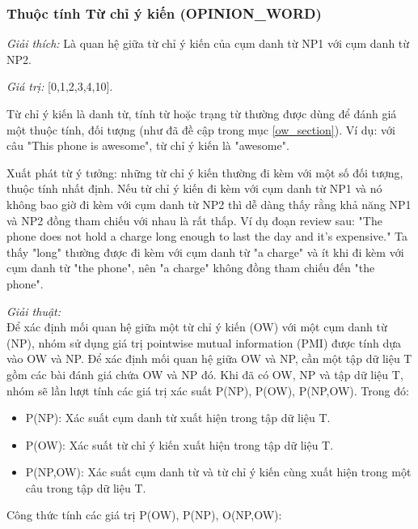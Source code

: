 \documentclass[12pt]{extarticle}
\begin{document}
			\subsubsection*{Thuộc tính Từ chỉ ý kiến (OPINION\_WORD)}
				\par \textit{Giải thích:} Là quan hệ giữa từ chỉ ý kiến của cụm danh từ NP1 với cụm danh từ NP2.
				\par \textit{Giá trị:} [0,1,2,3,4,10]. 
				\par Từ chỉ ý kiến là danh từ, tính từ hoặc trạng từ thường được dùng để đánh giá một thuộc tính, đối tượng (như đã đề cập trong mục \ref{ow_section}). Ví dụ: với câu "This phone is awesome", từ chỉ ý kiến là "awesome".
				\par Xuất phát từ ý tưởng: những từ chỉ ý kiến thường đi kèm với một số đối tượng, thuộc tính nhất định. Nếu từ chỉ ý kiến đi kèm với cụm danh từ NP1 và nó không bao giờ đi kèm với cụm danh từ NP2 thì dễ dàng thấy rằng khả năng NP1 và NP2 đồng tham chiếu với nhau là rất thấp. Ví dụ đoạn review sau: "The phone does not hold a charge long enough to last the day and it’s expensive." Ta thấy "long" thường được đi kèm với cụm danh từ "a charge" và ít khi đi kèm với cụm danh từ "the phone", nên "a charge" không đồng tham chiếu đến "the phone".
				\par \textit{Giải thuật:}
				\\Để xác định mối quan hệ giữa một từ chỉ ý kiến (OW) với một cụm danh từ (NP), nhóm sử dụng giá trị pointwise mutual information (PMI) được tính dựa vào OW và NP. Để xác định mối quan hệ giữa OW và NP, cần một tập dữ liệu T gồm các bài đánh giá chứa OW và NP đó. Khi đã có OW, NP và tập dữ liệu T, nhóm sẽ lần lượt tính các giá trị xác suất P(NP), P(OW), P(NP,OW). Trong đó:
				\begin{itemize} 
					\item{P(NP): Xác suất cụm danh từ xuất hiện trong tập dữ liệu T.}
					\item{P(OW): Xác suất từ chỉ ý kiến xuất hiện trong tập dữ liệu T.}
					\item{P(NP,OW): Xác suất cụm danh từ và từ chỉ ý kiến cùng xuất hiện trong một câu trong tập dữ liệu T.}
				\end{itemize}
				\par Công thức tính các giá trị P(OW), P(NP), O(NP,OW):
\end{document}
